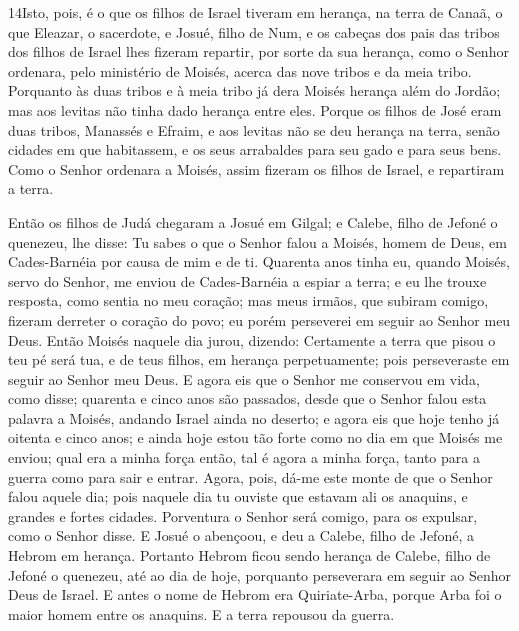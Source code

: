 \medskip

\lettrine{14} Isto, pois, é o que os filhos de Israel tiveram
em herança, na terra de Canaã, o que Eleazar, o sacerdote, e Josué,
filho de Num, e os cabeças dos pais das tribos dos filhos de Israel
lhes fizeram repartir, por sorte da sua herança, como o Senhor
ordenara, pelo ministério de Moisés, acerca das nove tribos e da
meia tribo. Porquanto às duas tribos e à meia tribo já dera
Moisés herança além do Jordão; mas aos levitas não tinha dado
herança entre eles. Porque os filhos de José eram duas tribos,
Manassés e Efraim, e aos levitas não se deu herança na terra, senão
cidades em que habitassem, e os seus arrabaldes para seu gado e para
seus bens. Como o Senhor ordenara a Moisés, assim fizeram os
filhos de Israel, e repartiram a terra.

Então os filhos de Judá chegaram a Josué em Gilgal; e Calebe,
filho de Jefoné o quenezeu, lhe disse: Tu sabes o que o Senhor falou
a Moisés, homem de Deus, em Cades-Barnéia por causa de mim e de ti.
Quarenta anos tinha eu, quando Moisés, servo do Senhor, me
enviou de Cades-Barnéia a espiar a terra; e eu lhe trouxe resposta,
como sentia no meu coração; mas meus irmãos, que subiram comigo,
fizeram derreter o coração do povo; eu porém perseverei em seguir ao
Senhor meu Deus. Então Moisés naquele dia jurou, dizendo:
Certamente a terra que pisou o teu pé será tua, e de teus filhos, em
herança perpetuamente; pois perseveraste em seguir ao Senhor meu
Deus. E agora eis que o Senhor me conservou em vida, como
disse; quarenta e cinco anos são passados, desde que o Senhor falou
esta palavra a Moisés, andando Israel ainda no deserto; e agora eis
que hoje tenho já oitenta e cinco anos; e ainda hoje estou
tão forte como no dia em que Moisés me enviou; qual era a minha
força então, tal é agora a minha força, tanto para a guerra como
para sair e entrar. Agora, pois, dá-me este monte de que o
Senhor falou aquele dia; pois naquele dia tu ouviste que estavam ali
os anaquins, e grandes e fortes cidades. Porventura o Senhor será
comigo, para os expulsar, como o Senhor disse. E Josué o
abençoou, e deu a Calebe, filho de Jefoné, a Hebrom em herança.
Portanto Hebrom ficou sendo herança de Calebe, filho de
Jefoné o quenezeu, até ao dia de hoje, porquanto perseverara em
seguir ao Senhor Deus de Israel. E antes o nome de Hebrom era
Quiriate-Arba, porque Arba foi o maior homem entre os anaquins. E a
terra repousou da guerra.


\medskip

